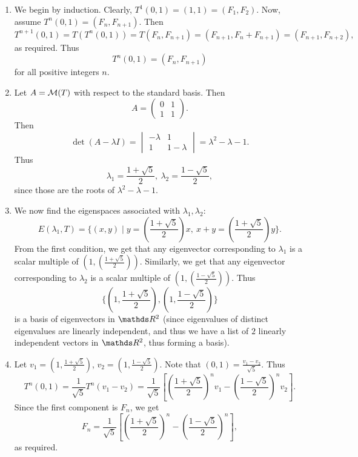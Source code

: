 \documentclass{review-sheet}
\begin{document}
\begin{solution}
  \begin{enumerate}[label=(\alph*)]
    \item We begin by induction. Clearly, $T^1(0,1)=(1,1)=(F_1,F_2)$. Now, assume
      $T^n(0,1)=(F_n,F_{n+1})$. Then \[
        T^{n+1}(0,1)=T(T^n(0,1))=T(F_n,F_{n+1})=(F_{n+1},F_n+F_{n+1})=(F_{n+1},F_{n+2})
      ,\] as required. Thus \[
        T^n(0,1)=(F_{n},F_{n+1})
      \] for all positive integers $n$.
    \item Let $A=\mathcal{M}(T)$ with respect to the standard basis. Then \[
        A = \begin{pmatrix} 0 & 1\\ 1 & 1 \end{pmatrix} 
    .\] Then \[
    \det{(A-\lambda I)}=\begin{vmatrix} -\lambda & 1\\1 & 1-\lambda \end{vmatrix}
      =\lambda^2-\lambda-1
      .\] Thus \[
        \lambda_1=\frac{1+\sqrt{5}}{2},\ \lambda_2=\frac{1-\sqrt{5}}{2}
      ,\] since those are the roots of $\lambda^2-\lambda-1$.
    \item We now find the eigenspaces associated with $\lambda_1,\lambda_2$: \[
        E(\lambda_1,T)=\{ (x,y)\mid y=\left( \frac{1+\sqrt{5}}{2} \right)x,\ x+y=\left(
        \frac{1+\sqrt{5}}{2} \right)y \}
      .\] From the first condition, we get that any eigenvector corresponding to $\lambda_1$ is a
      scalar multiple of $\left( 1,\left( \frac{1+\sqrt{5}}{2} \right)  \right)$. Similarly, we get
      that any eigenvector corresponding to $\lambda_2$ is a scalar multiple of $\left( 1,\left(
      \frac{1-\sqrt{5}}{2} \right)  \right) $. Thus \[
        \{ \left( 1,\frac{1+\sqrt{5}}{2} \right) , \left( 1, \frac{1-\sqrt{5}}{2} \right)  \}
      \] is a basis of eigenvectors in $\R^2$ (since eigenvalues of distinct eigenvalues are
      linearly independent, and thus we have a list of $2$ linearly independent vectors in $\R^2$,
      thus forming a basis).
    \item Let $v_1=\left( 1,\frac{1+\sqrt{5}}{2} \right) $, $v_2=\left( 1, \frac{1-\sqrt{5}}{2}
      \right)$. Note that $(0,1)=\frac{v_1-v_2}{\sqrt{5}}$. Thus \[
        T^n(0,1)=\frac{1}{\sqrt{5}}T^n(v_1-v_2)=\frac{1}{\sqrt{5}}\left[
        \left(   \frac{1+\sqrt{5}}{2}\right)^nv_1-\left(\frac{1-\sqrt{5}}{2}\right)^nv_2 \right]
        .\] Since the first component is $F_n$, we get \[
        F_n = \frac{1}{\sqrt{5}}\left[
        \left(   \frac{1+\sqrt{5}}{2}\right)^n-\left(\frac{1-\sqrt{5}}{2}\right)^n\right]
      ,\] as required.
  \end{enumerate}
\end{solution}
\end{document}
